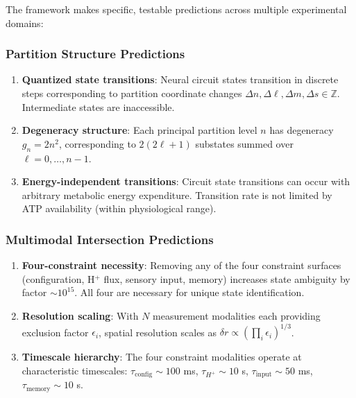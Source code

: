 \documentclass[aps,prd,twocolumn,superscriptaddress,floatfix,nofootinbib]{revtex4-2}
\theoremstyle{remark}
\begin{document}
The framework makes specific, testable predictions across multiple experimental domains:

\subsubsection{Partition Structure Predictions}

\begin{enumerate}
\item \textbf{Quantized state transitions}: Neural circuit states transition in discrete steps corresponding to partition coordinate changes $\Delta n, \Delta \ell, \Delta m, \Delta s \in \mathbb{Z}$. Intermediate states are inaccessible.

\item \textbf{Degeneracy structure}: Each principal partition level $n$ has degeneracy $g_n = 2n^2$, corresponding to $2(2\ell + 1)$ substates summed over $\ell = 0, \ldots, n-1$.

\item \textbf{Energy-independent transitions}: Circuit state transitions can occur with arbitrary metabolic energy expenditure. Transition rate is not limited by ATP availability (within physiological range).
\end{enumerate}

\subsubsection{Multimodal Intersection Predictions}

\begin{enumerate}
\item \textbf{Four-constraint necessity}: Removing any of the four constraint surfaces (configuration, H$^+$ flux, sensory input, memory) increases state ambiguity by factor $\sim 10^{15}$. All four are necessary for unique state identification.

\item \textbf{Resolution scaling}: With $N$ measurement modalities each providing exclusion factor $\epsilon_i$, spatial resolution scales as $\delta r \propto (\prod_i \epsilon_i)^{1/3}$.

\item \textbf{Timescale hierarchy}: The four constraint modalities operate at characteristic timescales: $\tau_{\text{config}} \sim 100$ ms, $\tau_{H^+} \sim 10$ s, $\tau_{\text{input}} \sim 50$ ms, $\tau_{\text{memory}} \sim 10$ s.
\end{enumerate}
\end{document}
